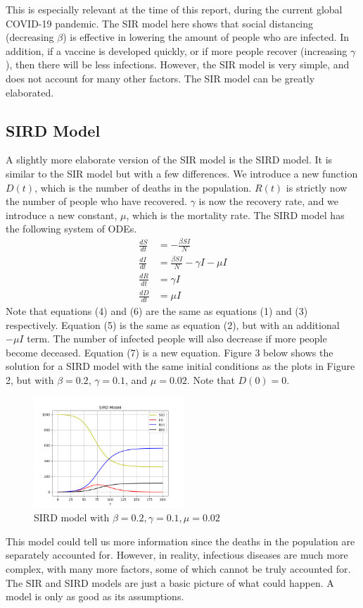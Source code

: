 \documentclass{article}
\begin{document}
This is especially relevant at the time of this report, during the current global COVID-19 pandemic. The SIR model here shows that social distancing (decreasing $\beta$) is effective in lowering the amount of people who are infected. In addition, if a vaccine is developed quickly, or if more people recover (increasing $\gamma$), then there will be less infections. However, the SIR model is very simple, and does not account for many other factors. The SIR model can be greatly elaborated.

\subsection{SIRD Model}
A slightly more elaborate version of the SIR model is the SIRD model. It is similar to the SIR model but with a few differences. We introduce a new function $D(t)$, which is the number of deaths in the population. $R(t)$ is strictly now the number of people who have recovered. $\gamma$ is now the recovery rate, and we introduce a new constant, $\mu$, which is the mortality rate. The SIRD model has the following system of ODEs.
\begin{align}
    \frac{dS}{dt} &= -\frac{\beta S I}{N}\\
    \frac{dI}{dt} &= \frac{\beta S I}{N} - \gamma I - \mu I\\
    \frac{dR}{dt} &= \gamma I\\
    \frac{dD}{dt} &= \mu I
\end{align}
Note that equations (4) and (6) are the same as equations (1) and (3) respectively. Equation (5) is the same as equation (2), but with an additional $-\mu I$ term. The number of infected people will also decrease if more people become deceased. Equation (7) is a new equation. Figure 3 below shows the solution for a SIRD model with the same initial conditions as the plots in Figure 2, but with $\beta=0.2$, $\gamma = 0.1$, and $\mu=0.02$. Note that $D(0)=0$.

\begin{figure}[H]
\centering
\includegraphics[width=0.5\textwidth]{SIRD_1.png}
\caption{SIRD model with $\beta=0.2, \gamma = 0.1, \mu=0.02$}
\label{fig:figure3}
\end{figure}

This model could tell us more information since the deaths in the population are separately accounted for. However, in reality, infectious diseases are much more complex, with many more factors, some of which cannot be truly accounted for. The SIR and SIRD models are just a basic picture of what could happen. A model is only as good as its assumptions.
\end{document}
